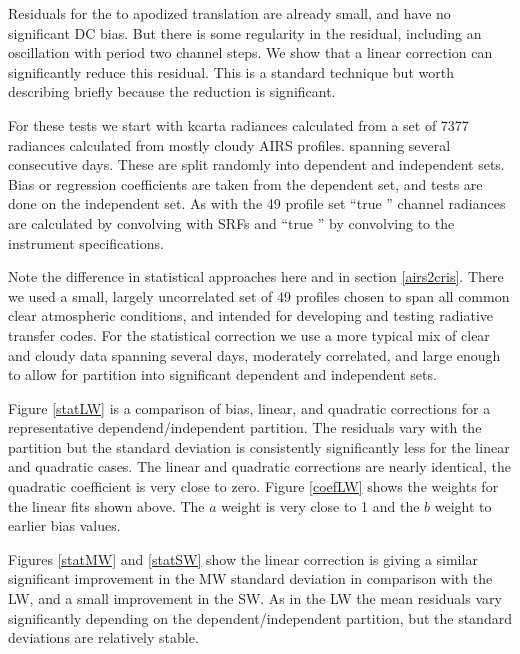 \documentclass[11pt]{article}
\begin{document}
Residuals for the {\airs} to apodized {\cris} translation are
already small, and have no significant DC bias.  But there is some
regularity in the residual, including an oscillation with period two
channel steps.  We show that a linear correction can significantly
reduce this residual.  This is a standard technique but worth
describing briefly because the reduction is significant.

For these tests we start with kcarta radiances calculated from a 
set of 7377 radiances calculated from mostly cloudy AIRS profiles.
spanning several consecutive days.  These are split randomly into
dependent and independent sets.  Bias or regression coefficients are
taken from the dependent set, and tests are done on the independent
set.  As with the 49 profile set ``true {\airs}'' channel radiances
are calculated by convolving with {\airs} SRFs and ``true {\cris}''
by convolving to the {\cris} instrument specifications.

Note the difference in statistical approaches here and in section
\ref{airs2cris}.  There we used a small, largely uncorrelated set of
49 profiles chosen to span all common clear atmospheric conditions,
and intended for developing and testing radiative transfer codes.
For the statistical correction we use a more typical mix of clear
and cloudy data spanning several days, moderately correlated, and
large enough to allow for partition into significant dependent and
independent sets.

Figure \ref{statLW} is a comparison of bias, linear, and quadratic
corrections for a representative dependend/independent partition.
The residuals vary with the partition but the standard deviation is
consistently significantly less for the linear and quadratic cases.
The linear and quadratic corrections are nearly identical, the
quadratic coefficient is very close to zero.  Figure \ref{coefLW}
shows the weights for the linear fits shown above.  The $a$ weight
is very close to 1 and the $b$ weight to earlier bias values.

Figures \ref{statMW} and \ref{statSW} show the linear correction 
is giving a similar significant improvement in the MW standard
deviation in comparison with the LW, and a small improvement in the
SW.  As in the LW the mean residuals vary significantly depending on
the dependent/independent partition, but the standard deviations are
relatively stable.
\end{document}
